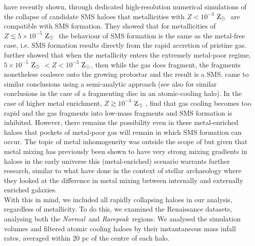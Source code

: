 \documentclass[twocolumn,iop,revtex4]{openjournal}
\newcommand{\zsolar} {$\rm{Z_{\odot}}~$}
\newcommand{\zsolarc} {$\rm{Z_{\odot}}$}
\newcommand{\rarepeak} {\textit{Rarepeak~}}
\newcommand{\normal} {\textit{Normal~}}
\begin{document}
\indent \cite{Chon_2020} have recently shown, through dedicated high-resolution numerical simulations
of the collapse of candidate SMS haloes that metallicities with $Z < 10^{-3}$ \zsolar
are compatible with SMS formation. They showed that for metallicities of $Z \lesssim 5 \times 10^{-5}$ \zsolar
the behaviour of SMS formation is the same as the metal-free case, i.e. SMS formation results
directly from the rapid accretion of pristine gas. 
\cite{Chon_2020} further showed that when the metallicity enters the
extremely metal-poor regime, $5 \times 10^{-5}$ \zsolar $ < Z < 10^{-3}$ \zsolarc, then while
the gas does fragment, the fragments nonetheless coalesce onto the growing protostar and the
result is a SMS. 
\cite{Tagawa_2020} came to similar conclusions
using a semi-analytic approach (see also \citealt{Inayoshi_2014b} for similar conclusions in the case of a fragmenting disc in an atomic-cooling halo).
In the case of higher metal enrichment,  $Z \gtrsim 10^{-3}$ \zsolar,
\citet{Chon_2020} find that gas cooling becomes too rapid and the gas fragments into low-mass fragments
and SMS formation is inhibited. However, there remains the possibility even in these
metal-enriched haloes that pockets of metal-poor gas will remain in which SMS formation can occur.
The topic of metal inhomogeneity was outside the scope of  \cite{Chon_2020} 
but given that metal mixing has previously been shown to have very strong mixing gradients
in haloes in the early universe
\citep[e.g.][]{Smith_2015} this (metal-enriched) scenario warrants further research, similar to 
what \cite{Tarumi_2020} have done in the context of stellar archaeology where they looked at the
difference in metal mixing between internally and externally enriched galaxies. \\
\indent With this in mind, we included all rapidly collapsing haloes in our analysis, regardless of
metallicity. To do this, we examined the Renaissance datasets, analysing
both the \normal and \rarepeak regions. We analysed the simulation volumes and filtered atomic
cooling haloes by their instantaneous mass infall rates, averaged within 20 pc of the centre of each halo.  \\
\end{document}
